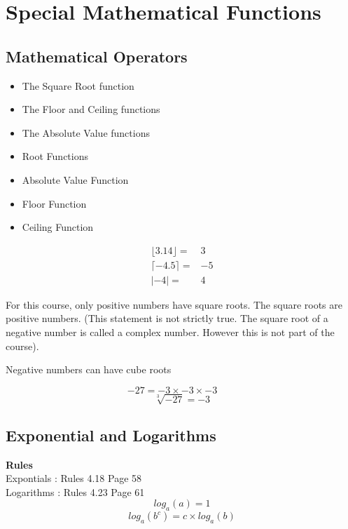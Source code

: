 \documentclass[]{report}
\begin{document}
\section{Special Mathematical Functions}
\subsection{Mathematical Operators}
\begin{itemize}
\item The Square Root function
\item The Floor and Ceiling functions
\item The Absolute Value functions
\end{itemize}


\begin{itemize}
\item Root Functions
\item Absolute Value Function
\item Floor Function
\item Ceiling Function
\end{itemize}
{

\begin{eqnarray}
\lfloor 3.14 \rfloor =& 3 \\
\lceil -4.5 \rceil =& -5 \\
| -4 | =&  4
\end{eqnarray}
}
For this course, only positive numbers have square roots. The square roots are positive numbers. (This statement is not strictly true. The square root of a negative number is called a complex number. However this is not part of the course).

Negative numbers can have cube roots

{
\[ -27 = -3 \times -3 \times -3 \qquad \]
\LARGE
\[ \sqrt[3]{-27} = -3 \]
}



\subsection*{Exponential and Logarithms}

\textbf{Rules}\\
Expontials : Rules 4.18 Page 58 \\
Logarithms : Rules 4.23 Page 61 \\

\[ log_a(a) = 1 \]
\[ log_a(b^c) = c \times log_a(b) \]
\end{document}
